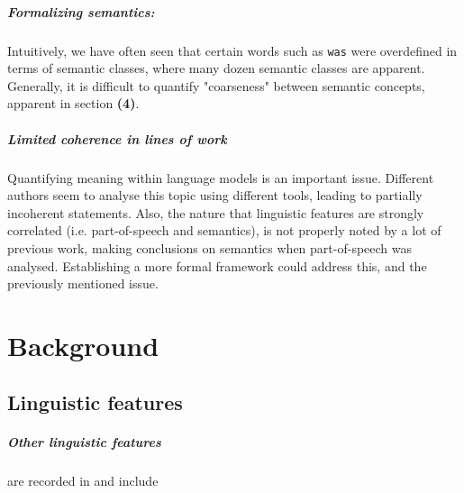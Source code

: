 \documentclass[a4paper,12pt,oneside,openright]{report}
\begin{document}
\paragraph{Formalizing semantics:}
Intuitively, we have often seen that certain words such as \texttt{was} were overdefined in terms of semantic classes, where many dozen semantic classes are apparent.
Generally, it is difficult to quantify "coarseness" between semantic concepts, apparent in section \textbf{(4)}.

\paragraph{Limited coherence in lines of work} Quantifying meaning within language models is an important issue.
Different authors seem to analyse this topic using different tools, leading to partially incoherent statements.
Also, the nature that linguistic features are strongly correlated (i.e. part-of-speech and semantics), is not properly noted by a lot of previous work, making conclusions on semantics when part-of-speech was analysed.
Establishing a more formal framework could address this, and the previously mentioned issue.


\appendix
\singlespacing

%  

% 
% 
 

\chapter{Background}

\section{Linguistic features}\label{appendix:linguistic_features}

\paragraph{Other linguistic features} are recorded in \cite{wang19} and include
\end{document}
